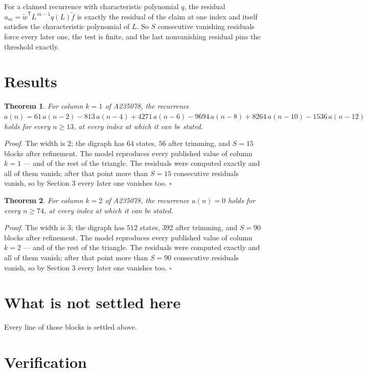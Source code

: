 \documentclass[11pt]{article}
\newtheorem{theorem}{Theorem}
\theoremstyle{definition}
\begin{document}
For a claimed recurrence with characteristic polynomial $q$, the residual $u_m = \tilde w^{\mathsf T}L^{\,m-1}q(L)\tilde f$ is exactly the residual of the claim at one index and itself satisfies the characteristic polynomial of $L$. So $S$ consecutive vanishing residuals force every later one, the test is finite, and the last nonvanishing residual pins the threshold exactly.

\section{Results}

\begin{theorem} For column $k = 1$ of A235078, the recurrence $a(n) = 61\,a(n-2) - 813\,a(n-4) + 4271\,a(n-6) - 9694\,a(n-8) + 8264\,a(n-10) - 1536\,a(n-12)$ holds for every $n \ge 13$, at every index at which it can be stated.\end{theorem}

{\itshape Proof.} The width is $2$; the digraph has $64$ states, $56$ after trimming, and $S = 15$ blocks after refinement. The model reproduces every published value of column $k = 1$ --- and of the rest of the triangle. The residuals were computed exactly and all of them vanish; after that point more than $S = 15$ consecutive residuals vanish, so by Section 3 every later one vanishes too. $\square$

\begin{theorem} For column $k = 2$ of A235078, the recurrence $a(n) = 0$ holds for every $n \ge 74$, at every index at which it can be stated.\end{theorem}

{\itshape Proof.} The width is $3$; the digraph has $512$ states, $392$ after trimming, and $S = 90$ blocks after refinement. The model reproduces every published value of column $k = 2$ --- and of the rest of the triangle. The residuals were computed exactly and all of them vanish; after that point more than $S = 90$ consecutive residuals vanish, so by Section 3 every later one vanishes too. $\square$

\section{What is not settled here}

Every line of those blocks is settled above.

\section{Verification}
\end{document}
